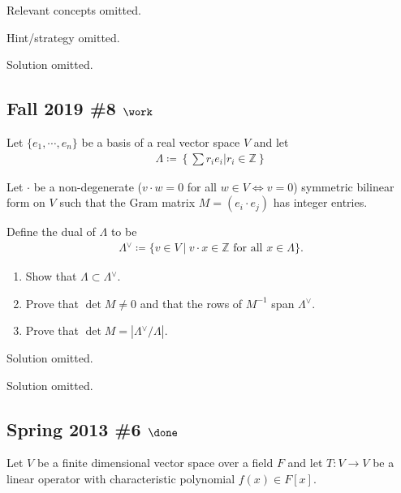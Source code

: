 Relevant concepts omitted.

Hint/strategy omitted.

Solution omitted.

\hypertarget{fall-2019-8-work}{%
\subsection{\texorpdfstring{Fall 2019 \#8
\(\work\)}{Fall 2019 \#8 \textbackslash work}}\label{fall-2019-8-work}}

Let \(\{e_1, \cdots, e_n \}\) be a basis of a real vector space \(V\)
and let
\begin{align*}
\Lambda \coloneqq\left\{{ \sum r_i e_i \mathrel{\Big|}r_i \in {\mathbb{Z}}}\right\}
\end{align*}

Let \(\cdot\) be a non-degenerate (\(v \cdot w = 0\) for all
\(w \in V \iff v = 0\)) symmetric bilinear form on \(V\) such that the
Gram matrix \(M = (e_i \cdot e_j )\) has integer entries.

Define the dual of \(\Lambda\) to be
\begin{align*}
\Lambda  {}^{ \vee }\coloneqq\{v \in V {~\mathrel{\Big|}~}v \cdot x \in {\mathbb{Z}}\text{ for all } x \in \Lambda
\}
.\end{align*}

\begin{enumerate}
\def\labelenumi{\alph{enumi}.}
\item
  Show that \(\Lambda \subset \Lambda {}^{ \vee }\).
\item
  Prove that \(\operatorname{det}M \neq 0\) and that the rows of
  \(M^{-1}\) span \(\Lambda {}^{ \vee }\).
\item
  Prove that \(\operatorname{det}M = |\Lambda {}^{ \vee }/\Lambda|\).
\end{enumerate}


Solution omitted.

Solution omitted.

\hypertarget{spring-2013-6-done}{%
\subsection{\texorpdfstring{Spring 2013 \#6
\(\done\)}{Spring 2013 \#6 \textbackslash done}}\label{spring-2013-6-done}}

Let \(V\) be a finite dimensional vector space over a field \(F\) and
let \(T: V\to V\) be a linear operator with characteristic polynomial
\(f(x) \in F[x]\).

